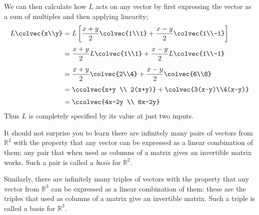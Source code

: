 \begin{example}
\[\]
We can then calculate how $L$ acts on any vector by first expressing the vector as  a sum of multiples and then applying linearity;
\begin{align*}
L\colvec{x\\y}
&=L\left[    \frac{x+y}{2} \colvec{1\\1} + \frac{x-y}{2} \colvec{1\\-1}  \right]\\[1mm]
&=\frac{x+y}{2} L \colvec{1\\1} + \frac{x-y}{2} L \colvec{1\\-1} \\[2mm]
&=\frac{x+y}{2} \colvec{2\\4} + \frac{x-y}{2}  \colvec{6\\8} \\[1mm]
&=\ccolvec{x+y \\ 2(x+y)} +  \colvec{3(x-y)\\4(x-y)}\\[1mm]
&=\ccolvec{4x-2y \\ 6x-2y}
\end{align*}
Thus $L$ is completely specified by its value at just two inputs. 
\end{example}

It should not surprise you to learn there are infinitely many pairs of vectors from $\mathbb{R}^2$ 
with the property that any vector can be expressed as a linear combination of them; any pair that when used as columns of a matrix gives an invertible matrix works. Such a pair is called a {\itshape basis} for $\mathbb{R}^2$.

Similarly, there are infinitely many triples of vectors with the property that any vector from $\mathbb{R}^3$ can be expressed as a linear combination of them: these are the triples that used as columns of a matrix give an invertible matrix. Such a triple is called a basis for $\mathbb{R}^3$.


